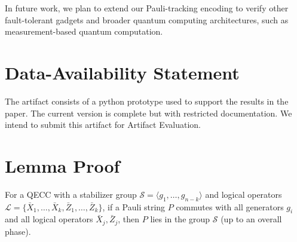 \documentclass[acmsmallw,review]{acmart}
\newcommand{\cy}[1]{}
\begin{document}
In future work, we plan to extend our Pauli-tracking encoding to verify other fault-tolerant gadgets and broader quantum computing architectures, such as measurement-based quantum computation.


\section*{Data-Availability Statement}
The artifact consists of a python prototype used to support the results in the paper. The current version is complete but with restricted documentation. We intend to submit this artifact for Artifact Evaluation.




\clearpage
 


\clearpage
\appendix

\section{Lemma Proof}
\begin{lemma}
For a QECC with a stabilizer group $\mathcal{S} = \langle g_1, \dots, g_{n-k} \rangle$ and logical operators $\mathcal{L} = \{\bar{X}_1, \dots, \bar{X}_k, \bar{Z}_1, \dots, \bar{Z}_k\}$, if a Pauli string $P$ commutes with all generators $g_i$ and all logical operators $\bar{X}_j, \bar{Z}_j$, then $P$ lies in the group $\mathcal{S}$ (up to an overall phase).
\end{lemma}
\end{document}
